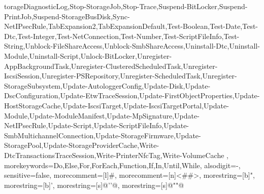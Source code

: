{{torageDiagnosticLog,Stop-StorageJob,Stop-Trace,Suspend-BitLocker,Suspend-PrintJob,Suspend-StorageBusDisk,Sync-NetIPsecRule,TabExpansion2,TabExpansionDefault,Test-Boolean,Test-Date,Test-Dtc,Test-Integer,Test-NetConnection,Test-Number,Test-ScriptFileInfo,Test-String,Unblock-FileShareAccess,Unblock-SmbShareAccess,Uninstall-Dtc,Uninstall-Module,Uninstall-Script,Unlock-BitLocker,Unregister-AppBackgroundTask,Unregister-ClusteredScheduledTask,Unregister-IscsiSession,Unregister-PSRepository,Unregister-ScheduledTask,Unregister-StorageSubsystem,Update-AutologgerConfig,Update-Disk,Update-DscConfiguration,Update-EtwTraceSession,Update-FirstObjectProperties,Update-HostStorageCache,Update-IscsiTarget,Update-IscsiTargetPortal,Update-Module,Update-ModuleManifest,Update-MpSignature,Update-NetIPsecRule,Update-Script,Update-ScriptFileInfo,Update-SmbMultichannelConnection,Update-StorageFirmware,Update-StoragePool,Update-StorageProviderCache,Write-DtcTransactionsTraceSession,Write-PrinterNfcTag,Write-VolumeCache
	},
	morekeywords={Do,Else,For,ForEach,Function,If,In,Until,While},
	alsodigit={-},
	sensitive=false,
	morecomment=[l]{\#},
	morecomment=[n]{<\#}{\#>},
	morestring=[b]{"},
	morestring=[b]{'},
	morestring=[s]{@'}{'@},
	morestring=[s]{@"}{"@}
}
